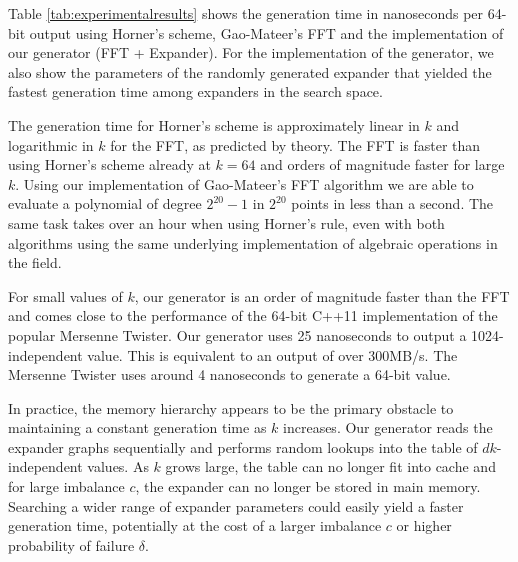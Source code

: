 \documentclass[a4paper,11pt]{article}
\theoremstyle{plain}
\theoremstyle{definition}
\begin{document}
Table \ref{tab:experimentalresults} shows the generation time in nanoseconds per 64-bit output using Horner's scheme, Gao-Mateer's FFT and the implementation of our generator (FFT + Expander).
For the implementation of the generator, we also show the parameters of the randomly generated expander that yielded the fastest generation time among expanders in the search space.

The generation time for Horner's scheme is approximately linear in $k$ and logarithmic in $k$ for the FFT, as predicted by theory. 
The FFT is faster than using Horner's scheme already at $k = 64$ and orders of magnitude faster for large $k$.
Using our implementation of Gao-Mateer's FFT algorithm we are able to evaluate a polynomial of degree $2^{20}-1$ in $2^{20}$ points in less than a second. 
The same task takes over an hour when using Horner's rule, even with both algorithms using the same underlying implementation of algebraic operations in the field.

For small values of $k$, our generator is an order of magnitude faster than the FFT and comes close to the performance of the 64-bit C++11 implementation of the popular Mersenne Twister.
Our generator uses 25 nanoseconds to output a 1024-independent value. This is equivalent to an output of over 300MB/s.
The Mersenne Twister uses around 4 nanoseconds to generate a 64-bit value.

In practice, the memory hierarchy appears to be the primary obstacle to maintaining a constant generation time as $k$ increases.
Our generator reads the expander graphs sequentially and performs random lookups into the table of $dk$-independent values.
As $k$ grows large, the table can no longer fit into cache and for large imbalance $c$, the expander can no longer be stored in main memory.
Searching a wider range of expander parameters could easily yield a faster generation time, potentially at the cost of a larger imbalance $c$ or higher probability of failure $\delta$.
\end{document}
